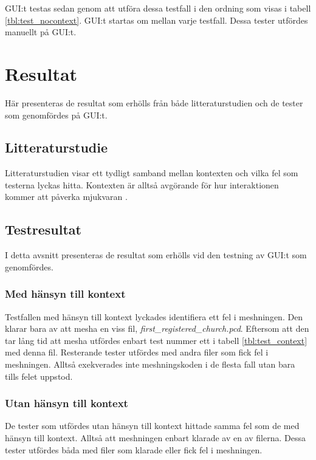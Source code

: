 GUI:t testas sedan genom att utföra dessa testfall i den ordning som visas i tabell \ref{tbl:test_nocontext}. GUI:t startas om mellan varje testfall. Dessa tester utfördes manuellt på GUI:t.

\section{Resultat}
\label{sec:results-holmberg}

Här presenteras de resultat som erhölls från både litteraturstudien och de tester som genomfördes på GUI:t.

\subsection{Litteraturstudie}

Litteraturstudien visar ett tydligt samband mellan kontexten och vilka fel som testerna lyckas hitta. Kontexten är alltså avgörande för hur interaktionen kommer att påverka mjukvaran \cite{yuan2011gui}. 

\subsection{Testresultat}

I detta avsnitt presenteras de resultat som erhölls vid den testning av GUI:t som genomfördes.

\subsubsection{Med hänsyn till kontext}

Testfallen med hänsyn till kontext lyckades identifiera ett fel i meshningen. Den klarar bara av att mesha en viss fil, \textit{first\_registered\_church.pcd}. Eftersom att den tar lång tid att mesha utfördes enbart test nummer ett i tabell \ref{tbl:test_context} med denna fil. Resterande tester utfördes med andra filer som fick fel i meshningen. Alltså exekverades inte meshningskoden i de flesta fall utan bara tills felet uppstod.

\subsubsection{Utan hänsyn till kontext}

De tester som utfördes utan hänsyn till kontext hittade samma fel som de med hänsyn till kontext. Alltså att meshningen enbart klarade av en av filerna. Dessa tester utfördes båda med filer som klarade eller fick fel i meshningen.

